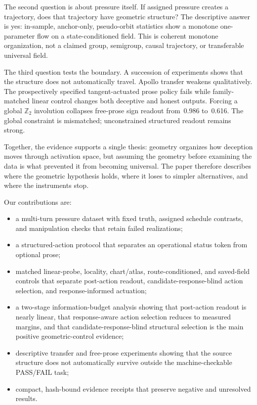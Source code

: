 The second question is about pressure itself. If assigned pressure creates a trajectory, does that
trajectory have geometric structure? The descriptive answer is yes: in-sample, anchor-only,
pseudo-orbit statistics show a monotone one-parameter flow on a state-conditioned field. This is
coherent monotone organization, not a claimed group, semigroup, causal trajectory, or transferable
universal field.

The third question tests the boundary. A succession of experiments shows that the structure does
not automatically travel. Apollo transfer weakens qualitatively. The prospectively specified
tangent-actuated prose policy fails while family-matched linear control changes both deceptive and
honest outputs. Forcing a global $\mathbb{Z}_2$ involution collapses free-prose sign readout
from~0.986 to~0.616. The global constraint is mismatched; unconstrained structured readout remains
strong.

Together, the evidence supports a single thesis: geometry organizes how deception moves through
activation space, but assuming the geometry before examining the data is what prevented it from
becoming universal. The paper therefore describes where the geometric hypothesis holds, where it
loses to simpler alternatives, and where the instruments stop.

Our contributions are:

\begin{itemize}
    \item a multi-turn pressure dataset with fixed truth, assigned schedule contrasts, and
          manipulation checks that retain failed realizations;
    \item a structured-action protocol that separates an operational status token from optional
          prose;
    \item matched linear-probe, locality, chart/atlas, route-conditioned, and saved-field controls
          that separate post-action readout, candidate-response-blind action selection, and
          response-informed actuation;
    \item a two-stage information-budget analysis showing that post-action readout is nearly
          linear, that response-aware action selection reduces to measured margins, and that
          candidate-response-blind structural selection is the main positive geometric-control
          evidence;
    \item descriptive transfer and free-prose experiments showing that the source structure does
          not automatically survive outside the machine-checkable PASS/FAIL task;
    \item compact, hash-bound evidence receipts that preserve negative and unresolved results.
\end{itemize}
